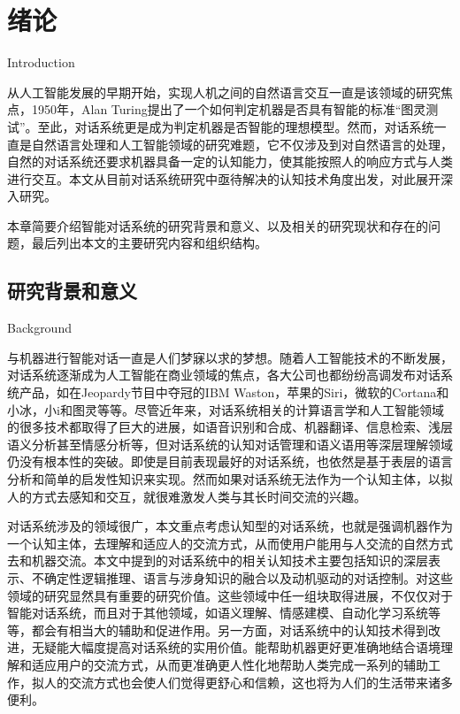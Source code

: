 \chapter{绪论}{Introduction}
\label{chap:intro}

从人工智能发展的早期开始，实现人机之间的自然语言交互一直是该领域的研究焦点，1950年，Alan Turing提出了一个如何判定机器是否具有智能的标准“图灵测试”。至此，对话系统更是成为判定机器是否智能的理想模型。然而，对话系统一直是自然语言处理和人工智能领域的研究难题，它不仅涉及到对自然语言的处理，自然的对话系统还要求机器具备一定的认知能力，使其能按照人的响应方式与人类进行交互。本文从目前对话系统研究中亟待解决的认知技术角度出发，对此展开深入研究。

本章简要介绍智能对话系统的研究背景和意义、以及相关的研究现状和存在的问题，最后列出本文的主要研究内容和组织结构。

\section{研究背景和意义}{Background}

      与机器进行智能对话一直是人们梦寐以求的梦想。随着人工智能技术的不断发展，对话系统逐渐成为人工智能在商业领域的焦点，各大公司也都纷纷高调发布对话系统产品，如在Jeopardy节目中夺冠的IBM Waston，苹果的Siri，微软的Cortana和小冰，小i和图灵等等。尽管近年来，对话系统相关的计算语言学和人工智能领域的很多技术都取得了巨大的进展，如语音识别和合成、机器翻译、信息检索、浅层语义分析甚至情感分析等，但对话系统的认知对话管理和语义语用等深层理解领域仍没有根本性的突破。即使是目前表现最好的对话系统，也依然是基于表层的语言分析和简单的启发性知识来实现。然而如果对话系统无法作为一个认知主体，以拟人的方式去感知和交互，就很难激发人类与其长时间交流的兴趣。
   
       对话系统涉及的领域很广，本文重点考虑认知型的对话系统，也就是强调机器作为一个认知主体，去理解和适应人的交流方式，从而使用户能用与人交流的自然方式去和机器交流。本文中提到的对话系统中的相关认知技术主要包括知识的深层表示、不确定性逻辑推理、语言与涉身知识的融合以及动机驱动的对话控制。对这些领域的研究显然具有重要的研究价值。这些领域中任一组块取得进展，不仅仅对于智能对话系统，而且对于其他领域，如语义理解、情感建模、自动化学习系统等等，都会有相当大的辅助和促进作用。另一方面，对话系统中的认知技术得到改进，无疑能大幅度提高对话系统的实用价值。能帮助机器更好更准确地结合语境理解和适应用户的交流方式，从而更准确更人性化地帮助人类完成一系列的辅助工作，拟人的交流方式也会使人们觉得更舒心和信赖，这也将为人们的生活带来诸多便利。

